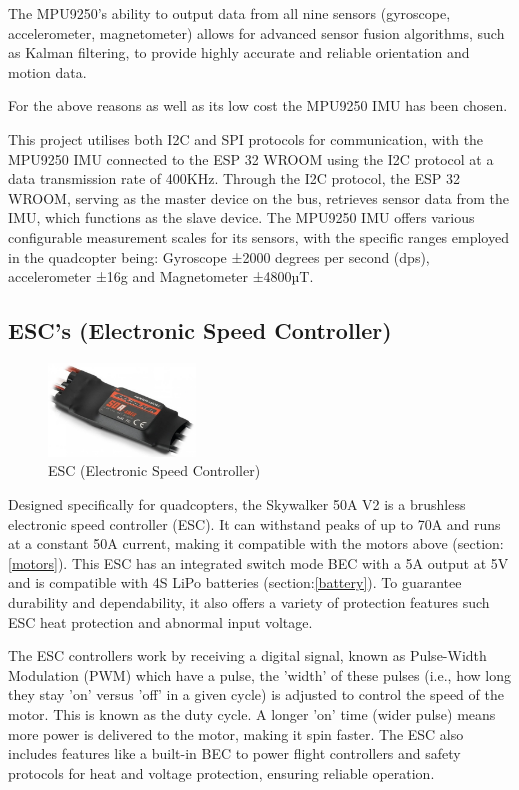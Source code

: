 \documentclass{article}
\begin{document}
The MPU9250's ability to output data from all nine sensors (gyroscope,
accelerometer, magnetometer) allows for advanced sensor fusion algorithms, such
as Kalman filtering, to provide highly accurate and reliable orientation and
motion data.

For the above reasons as well as its low cost the MPU9250 IMU has been chosen.

This project utilises both I2C and SPI protocols for communication, with the
MPU9250 IMU connected to the ESP 32 WROOM using the I2C protocol at a data
transmission rate of 400KHz. Through the I2C protocol, the ESP 32 WROOM, serving
as the master device on the bus, retrieves sensor data from the IMU, which
functions as the slave device. The MPU9250 IMU offers various configurable
measurement scales for its sensors, with the specific ranges employed in the
quadcopter being: Gyroscope ±2000 degrees per second (dps), accelerometer ±16g
and Magnetometer ±4800µT.

\subsection{ESC's (Electronic Speed Controller)}\label{esc}
\begin{figure}[H]
  \centering
  \includegraphics[width=0.35\textwidth]{Pictures/esc.png}
  \caption{ESC (Electronic Speed Controller)}
  \label{fig:esc}
\end{figure}
Designed specifically for quadcopters, the Skywalker 50A V2 is a brushless
electronic speed controller (ESC). It can withstand peaks of up to 70A and runs
at a constant 50A current, making it compatible with the motors above
(section:\ref{motors}). This ESC has an integrated switch mode BEC with a 5A
output at 5V and is compatible with 4S LiPo batteries (section:\ref{battery}).
To guarantee durability and dependability, it also offers a variety of
protection features such ESC heat protection and abnormal input voltage.

The ESC controllers work by receiving a digital signal, known as Pulse-Width
Modulation (PWM) which have a pulse, the 'width' of these pulses (i.e., how long
they stay 'on' versus 'off' in a given cycle) is adjusted to control the speed
of the motor. This is known as the duty cycle. A longer 'on' time (wider pulse)
means more power is delivered to the motor, making it spin faster. The ESC also
includes features like a built-in BEC to power flight controllers and safety
protocols for heat and voltage protection, ensuring reliable operation.
\end{document}
